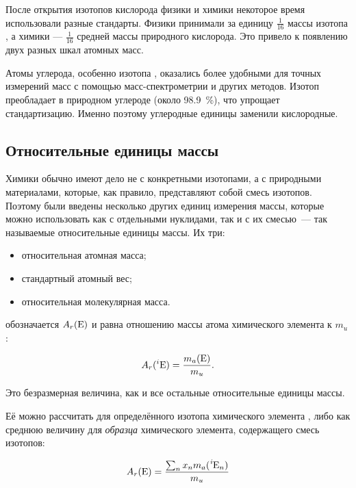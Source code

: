 После открытия изотопов кислорода физики и химики некоторое время использовали разные стандарты. Физики принимали за единицу $\frac{1}{16}$ массы изотопа , а химики --- $\frac{1}{16}$ средней массы природного кислорода. Это привело к появлению двух разных шкал атомных масс.

Атомы углерода, особенно изотопа , оказались более удобными для точных измерений масс с помощью масс-спектрометрии и других методов. Изотоп  преобладает в природном углероде (около \qty{98,9}{\percent}), что упрощает стандартизацию. Именно поэтому углеродные единицы заменили кислородные.

\subsection*{Относительные единицы массы}

Химики обычно имеют дело не с конкретными изотопами, а с природными материалами, которые, как правило, представляют собой смесь изотопов. Поэтому были введены несколько других единиц измерения массы, которые можно использовать как с отдельными нуклидами, так и с их смесью~--- так называемые относительные единицы массы. Их три:

\begin{itemize}
    \item относительная атомная масса;
    \item стандартный атомный вес;
    \item относительная молекулярная масса.
\end{itemize}

 обозначается $A_r(\ce{E})$ и равна отношению массы атома химического элемента к $m_u$:

\begin{equation*}
    A_r({}^i\ce{E}) = \frac{m_a(\ce{E})}{m_u}.
\end{equation*}

Это безразмерная величина, как и все остальные относительные единицы массы.

Её можно рассчитать для определённого изотопа химического элемента , либо как среднюю величину для \emph{образца} химического элемента, содержащего смесь изотопов:

\begin{equation*}
    A_r(\ce{E}) = \frac{\sum_{n}^{} x_nm_a(\ce{^$i$E}_n)}{m_u}
\end{equation*}


